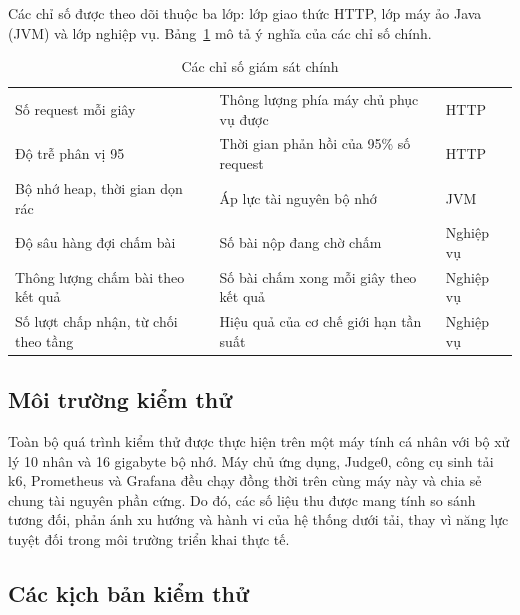 \documentclass[12pt, a4paper]{report}
\begin{document}
Các chỉ số được theo dõi thuộc ba lớp: lớp giao thức \ac{HTTP}, lớp máy ảo Java (\ac{JVM})
và lớp nghiệp vụ. Bảng~\ref{tab:metrics} mô tả ý nghĩa của các chỉ số chính.

\begin{table}[H]
  \centering
  \begin{tabular}{|>{\raggedright\arraybackslash}p{5.5cm}|>{\raggedright\arraybackslash}p{5.5cm}|>{\raggedright\arraybackslash}p{2cm}|}
    \hline
    \multicolumn{1}{|c|}{\textbf{Chỉ số}}
      & \multicolumn{1}{c|}{\textbf{Ý nghĩa}}
      & \multicolumn{1}{c|}{\textbf{Lớp}} \\
    \hline
    Số request mỗi giây & Thông lượng phía máy chủ phục vụ được & \ac{HTTP} \\
    \hline
    Độ trễ phân vị 95 & Thời gian phản hồi của 95\% số request & \ac{HTTP} \\
    \hline
    Bộ nhớ heap, thời gian dọn rác & Áp lực tài nguyên bộ nhớ & \ac{JVM} \\
    \hline
    Độ sâu hàng đợi chấm bài & Số bài nộp đang chờ chấm & Nghiệp vụ \\
    \hline
    Thông lượng chấm bài theo kết quả & Số bài chấm xong mỗi giây theo kết quả
      & Nghiệp vụ \\
    \hline
    Số lượt chấp nhận, từ chối theo tầng & Hiệu quả của cơ chế giới hạn tần suất
      & Nghiệp vụ \\
    \hline
  \end{tabular}
  \caption{Các chỉ số giám sát chính}\label{tab:metrics}
\end{table}

\subsection{Môi trường kiểm thử}

Toàn bộ quá trình kiểm thử được thực hiện trên một máy tính cá nhân với bộ xử lý 10 nhân
và 16 gigabyte bộ nhớ. Máy chủ ứng dụng, Judge0, công cụ sinh tải k6, Prometheus và Grafana
đều chạy đồng thời trên cùng máy này và chia sẻ chung tài nguyên phần cứng. Do đó, các số
liệu thu được mang tính so sánh tương đối, phản ánh xu hướng và hành vi của hệ thống dưới
tải, thay vì năng lực tuyệt đối trong môi trường triển khai thực tế.

\subsection{Các kịch bản kiểm thử}
\end{document}
